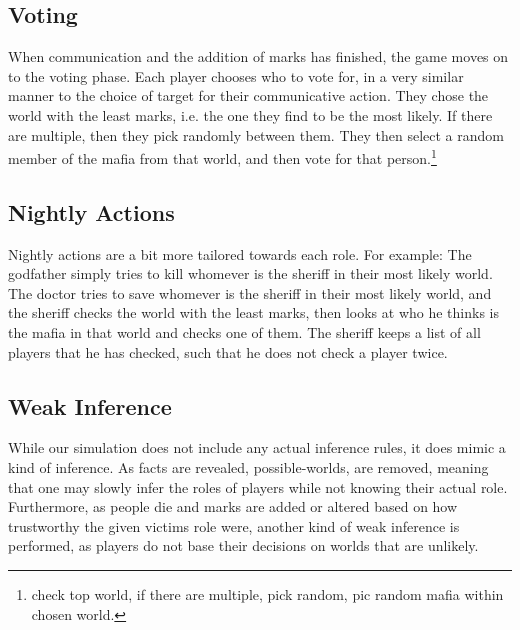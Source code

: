 \subsection{Voting}\label{Voting}
When communication and the addition of marks has finished, the game moves on to 
the voting phase. Each player chooses who to vote for, in a very similar manner 
to the choice of target for their communicative action. They chose the world 
with the least marks, i.e. the one they find to be the most likely. If there 
are multiple, then they pick randomly between them. They then select a random 
member of the mafia from that world, and then vote for that person.\footnote[2]{
check top world, if there are multiple, pick random, pic random mafia within 
chosen world.} 
\subsection{Nightly Actions}\label{NightlyActions}
Nightly actions are a bit more tailored towards each role. For example: The 
godfather simply tries to kill whomever is the sheriff in their most likely 
world. The doctor tries to save whomever is the sheriff in their most likely 
world, and the sheriff checks the world with the least marks, then looks at who he thinks is the mafia in that world and checks one of them. The sheriff keeps a list of all players that he has checked, such that he does not check a player twice.
\subsection{Weak Inference}\label{WeakInference}
While our simulation does not include any actual inference rules, it does mimic 
a kind of inference. As facts are revealed, possible-worlds, are removed, 
meaning that one may slowly infer the roles of players while not knowing their 
actual role. Furthermore, as people die and 
marks are added or altered based on how trustworthy the given victims role 
were, another kind of weak inference is performed, as players do not base their 
decisions on worlds that are unlikely. 

